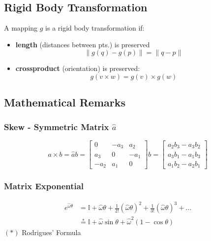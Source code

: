 \subsection{Rigid Body Transformation}
    A mapping $g$ is a rigid body transformation if:
    \begin{itemize}
        \item \textbf{length} (distances between pts.) is preserved
            $$
                \lVert g(q) - g (p) \rVert = \lVert q - p \rVert
            $$
        \item \textbf{crossproduct} (orientation) is preserved:
            $$
                g(v\times w) = g(v) \times g(w)
            $$
    \end{itemize}
\subsection{Mathematical Remarks}
    \subsubsection{Skew - Symmetric Matrix \texorpdfstring{\hfill $\widehat{a}$}{}}
        \vspace{-1em}
        $$
            a \times b = \widehat{a} b = 
            \begin{bmatrix}
                0   & -a_3 &  a_2\\
                a_3 &    0 & -a_1\\
                -a_2&  a_1 &    0
            \end{bmatrix}
            b
            =
            \begin{bmatrix}
                a_2 b_3 - a_3 b_2\\
                a_3 b_1 - a_1 b_3\\
                a_1 b_2 - a_2 b_1
            \end{bmatrix}
        $$
    \subsubsection{Matrix Exponential}
        \vspace{-0.5em}
        \begin{align*}
            e^{\widehat{\omega} \theta} &= \mathbb{I} + \widehat{\omega} \theta + \frac{1}{2!} (\widehat{\omega} \theta)^2 + \frac{1}{3!} (\widehat{\omega} \theta)^3 + \dots\\[0.5em]
                                        &\overset{*}{=} \mathbb{I} + \widehat{\omega} \sin\theta + \widehat{\omega}^2 (1 -\cos\theta)
        \end{align*}
        $(*)$ Rodrigues' Formula
